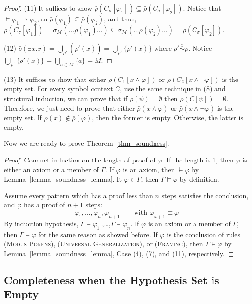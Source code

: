 \documentclass[acmsmall]{acmart}
\theoremstyle{acmdefinition}
\newcommand{\imp}{\to}
\newcommand{\MM}{\mathcal{M}}
\newcommand{\sigmaM}{{\sigma_{\MM}}}
\newcommand{\widebar}[1]{\overline{#1}}
\newcommand{\rhop}{\rho'}
\newcommand{\barrho}{\bar{\rho}}
\newcommand{\barrhop}{\widebar{\rhop}}
\newcommand{\simon}[1]{\overset{#1}{\sim}}
\newcommand{\CSub}[1]{C_{#1}}
\newcommand{\Csigma}{\CSub{\sigma}}
\newcommand{\prule}[1]{\textsc{(#1)}}
\newcommand{\modusponens}{\prule{Modus Ponens}\xspace}
\newcommand{\universalgeneralization}{\prule{Universal Generalization}\xspace}
\newcommand{\framing}{\prule{Framing}\xspace}
\newcommand{\ddd}{,\dots,}
\begin{document}
\begin{proof}
	(11)
	It suffices to show
	$\barrho(\Csigma[\varphi_1]) \subseteq \barrho(\Csigma[\varphi_2])$.
	Notice that
	$\vDash \varphi_1 \imp \varphi_2$,
	so $\barrho(\varphi_1) \subseteq \barrho(\varphi_2)$,
	and thus,
	$\barrho(\Csigma[\varphi_1])
	= \sigmaM(\dots \barrho(\varphi_1) \dots)
	\subseteq \sigmaM(\dots \barrho(\varphi_2) \dots)
	= \barrho(\Csigma[\varphi_2])$.
	
	(12)
	$\barrho(\exists x . x)
	= \bigcup_{\rhop}(\barrhop(x))
	= \bigcup_{\rhop} \{ \rhop(x) \}$
	where $\rhop \simon{x} \rho$.
	Notice $\bigcup_{\rhop} \{ \rhop(x) \} = \bigcup_{a \in M} \{ a \} = M.$
\end{proof}

(13)
It suffices to show that
either
$\barrho(C_1[x \wedge \varphi])$
or
$\barrho(C_2[x \wedge \neg \varphi])$ is the empty set.
For every symbol context $C$,
use the same technique in (8) and structural induction,
we can prove that if $\barrho(\psi) = \emptyset$ then
$\barrho(C[\psi]) = \emptyset$.
Therefore, we just need to prove that
either
$\barrho(x \wedge \varphi)$
or
$\barrho(x \wedge \neg \varphi)$ is the empty set.
If $\rho(x) \not\in \barrho(\varphi)$, then the former is empty.
Otherwise, the latter is empty.

Now we are ready to prove Theorem~\ref{thm_soundness}.
\soundness*
\begin{proof}
Conduct induction on the length of proof of $\varphi$.
If the length is 1, then $\varphi$ is either an axiom or a member of
$\Gamma$.
If $\varphi$ is an axiom, then $\vDash \varphi$ by 
Lemma~\ref{lemma_soundness_lemma}.
It $\varphi \in \Gamma$, then $\Gamma \vDash \varphi$ by definition.

Assume every pattern which has a proof less than $n$ steps satisfies
the conclusion,
and $\varphi$ has a proof of $n+1$ steps:
$$
\varphi_1 \ddd \varphi_{n} , \varphi_{n+1}
\qquad
\text{with $\varphi_{n+1} \equiv \varphi$}
$$
By induction hypothesis,
$\Gamma \vDash \varphi_1$ \ddd $\Gamma \vDash \varphi_n$.
If $\varphi$ is an axiom or a member of $\Gamma$, 
then $\Gamma \vDash \varphi$ for the same reason as showed before.
If $\varphi$ is the conclusion of rules
\modusponens, \universalgeneralization, or \framing,
then $\Gamma \vDash \varphi$ by Lemma~\ref{lemma_soundness_lemma},
Case (4), (7), and (11), respectively.
\end{proof}

\subsection{Completeness when the Hypothesis Set is Empty}
\end{document}
